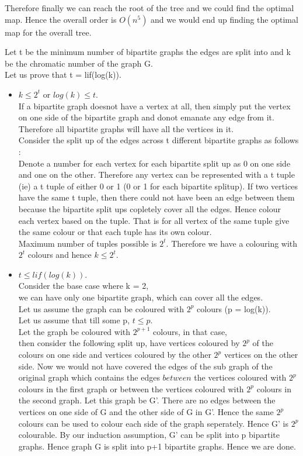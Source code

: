 \documentclass[solution,addpoints,12pt]{exam}
\begin{document}
\begin{questions}
\begin{parts}
Therefore finally we can reach the root of the tree and we could find the
optimal map. Hence the overall order is $O(n^5)$ and we would end up
finding the optimal map for the overall tree.\\
\end{parts}
\question
Let t be the minimum number of bipartite graphs the edges are split into and k be the
chromatic number of the graph G.\\
Let us prove that t = lif(log(k)).\\
\begin{itemize}
\item $k \le 2^t$ or $log(k) \le t$.\\
If a bipartite graph doesnot have a vertex at all, then simply put the vertex on
one side of the bipartite graph and donot emanate any edge from it. Therefore
all bipartite graphs will have all the vertices in it.\\
Consider the split up of the edges across t different bipartite graphs as follows :\\
Denote a number for each vertex for each bipartite split up as 0 on one side and
one on the other. Therefore any vertex can be represented with a t tuple
(ie) a t tuple of either 0 or 1 (0 or 1 for each bipartite splitup). If two
vertices have the same t tuple, then there could not have been an edge between
them because the bipartite split ups copletely cover all the edges. Hence colour
each vertex based on the tuple. That is for all vertex of the same tuple
give the same colour or that each tuple has its own colour.\\
Maximum number of tuples possible is $2^t$. Therefore we have a colouring
with $2^t$ colours and hence $k \le 2^t$.\\
\item $t \le lif(log(k))$.\\
Consider the base case where k = 2,\\
we can have only one bipartite graph, which can cover all the edges.\\
Let us assume the graph can be coloured with $2^p$ colours (p = log(k)).\\
Let us assume that till some p, $t \le p$.\\
Let the graph be coloured with $2^{p+1}$ colours, in that case,\\
then consider the following split up, have vertices coloured by $2^p$
of the colours on one side and vertices coloured by the other $2^p$ vertices
on the other side. Now we would not have covered the
edges of the sub graph of the original graph which contains the edges
$between$ the vertices coloured with $2^p$ colours in the first graph
or between the vertices coloured with $2^p$ colours in the second graph.
Let this graph be G'. There are no edges between the vertices
on one side of G and the other side of G in G'. Hence the same $2^p$ colours
can be used to colour each side of the graph seperately. Hence G' is $2^p$
colourable. By our induction assumption, G' can be split into
p bipartite graphs. Hence graph G is split into p+1 bipartite graphs.
Hence we are done.\\


\end{itemize}
\end{questions}
\end{document}
